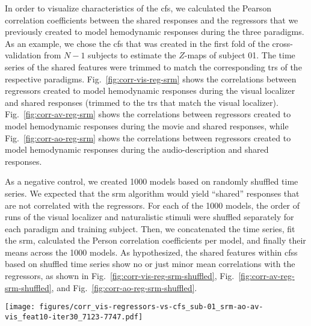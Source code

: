 In order to visualize characteristics of the \ac{cfs}, we calculated the Pearson
correlation coefficients between the shared responses and the regressors that we
previously created \citep[cf.][]{sengupta2016extension, haeusler2022processing}
to model hemodynamic responses during the three paradigms.
%
As an example, we chose the \ac{cfs} that was created in the first fold of the
cross-validation from $N-1$ subjects to estimate the $Z$-maps of subject 01.
%
The time series of the shared features were trimmed to match the corresponding
\acp{tr} of the respective paradigms.
%
Fig.~\ref{fig:corr-vis-reg-srm} shows the correlations between regressors
created to model hemodynamic responses during the visual localizer and shared
responses (trimmed to the \acp{tr} that match the visual localizer).
Fig.~\ref{fig:corr-av-reg-srm} shows the correlations between regressors created
to model hemodynamic responses during the movie \citep[cf. Table 3
in][]{haeusler2022processing} and shared responses, while
Fig.~\ref{fig:corr-ao-reg-srm} shows the correlations between regressors created
to model hemodynamic responses during the audio-description \citep[cf. Table 3
in][]{haeusler2022processing} and shared responses.




As a negative control, we created 1000 models based on randomly shuffled time
series.
%
We expected that the \ac{srm} algorithm would yield ``shared'' responses that
are not correlated with the regressors.
%
For each of the 1000 models, the order of runs of the visual localizer and
naturalistic stimuli were shuffled separately for each paradigm and training
subject.
%
Then, we concatenated the time series, fit the \ac{srm}, calculated the Person
correlation coefficients per model, and finally their means across the 1000
models.
%
As hypothesized, the shared features within \acp{cfs} based on shuffled time
series show no or just minor mean correlations with the regressors, as shown in
%
Fig.~\ref{fig:corr-vis-reg-srm-shuffled},
%
Fig.~\ref{fig:corr-av-reg-srm-shuffled}, and
%
Fig.~\ref{fig:corr-ao-reg-srm-shuffled}.


\begin{figure*}[tbp]
\centering
\texttt{[image: figures/corr\_vis-regressors-vs-cfs\_sub-01\_srm-ao-av-vis\_feat10-iter30\_7123-7747.pdf]}
\caption{
%
\textbf{Pearson correlation coefficients between regressors of the visual
localizer and shared features.}
%
The time series of the shared features within the multi-paradigm \ac{cfs}
%
(as calculated for subject 01 in the first fold of the cross-validation)
%
were trimmed to match the corresponding \acp{tr} of the visual localizer
paradigm \citep{sengupta2016extension}.
%
The six regressors of the visual localizer model hemodynamic responses to
the six categories of pictures that were presented in blocks.
}
\label{fig:corr-vis-reg-srm}
\end{figure*}


